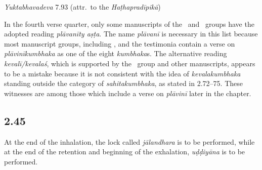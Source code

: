 \begin{ekdosis}
\begin{testimonia}[hp02_044]
\emph{Yuktabhavadeva} 7.93 (attr.~to the \emph{Haṭhapradīpikā})
\begin{versinnote}
\end{versinnote}

\end{testimonia}

\begin{philcomm}[hp02_044]
In the fourth verse quarter, only some manuscripts of the \textepsilon\ and \textgamma\ groups have the adopted reading \emph{plāvanīty aṣṭa}. The name \emph{plāvanī} is necessary in this list because most manuscript groups, including \textalpha, and the testimonia contain a verse on \emph{plāvinīkumbhaka} as one of the eight \emph{kumbhaka}s. The alternative reading \emph{kevalī/kevalaś}, which is supported by the \textalpha\ group and other manuscripts, appears to be a mistake because it is not consistent with the idea of \emph{kevalakumbhaka} standing outside the category of \emph{sahitakumbhaka}, as stated in 2.72–75. These witnesses are among those which include a verse on \emph{plāvinī} later in the chapter. 
%
\end{philcomm}

\subsection*{2.45}
\begin{translation}[hp02_045]
At the end of the inhalation, the lock called \emph{jālandhara} is to be performed, while at the end of the retention and beginning of the exhalation, \emph{uḍḍiyāna} is to be performed.
\end{translation}


\end{ekdosis}
